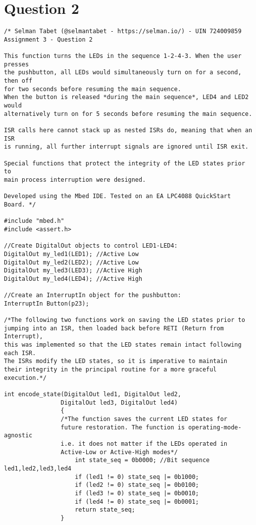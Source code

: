 \documentclass{article}
\begin{document}
\section*{Question 2}
\begin{verbatim}
/* Selman Tabet (@selmantabet - https://selman.io/) - UIN 724009859
Assignment 3 - Question 2

This function turns the LEDs in the sequence 1-2-4-3. When the user presses
the pushbutton, all LEDs would simultaneously turn on for a second, then off
for two seconds before resuming the main sequence. 
When the button is released *during the main sequence*, LED4 and LED2 would
alternatively turn on for 5 seconds before resuming the main sequence.

ISR calls here cannot stack up as nested ISRs do, meaning that when an ISR
is running, all further interrupt signals are ignored until ISR exit.

Special functions that protect the integrity of the LED states prior to
main process interruption were designed.

Developed using the Mbed IDE. Tested on an EA LPC4088 QuickStart Board. */

#include "mbed.h"
#include <assert.h>

//Create DigitalOut objects to control LED1-LED4:
DigitalOut my_led1(LED1); //Active Low
DigitalOut my_led2(LED2); //Active Low
DigitalOut my_led3(LED3); //Active High
DigitalOut my_led4(LED4); //Active High

//Create an InterruptIn object for the pushbutton:
InterruptIn Button(p23);

/*The following two functions work on saving the LED states prior to 
jumping into an ISR, then loaded back before RETI (Return from Interrupt),
this was implemented so that the LED states remain intact following each ISR.
The ISRs modify the LED states, so it is imperative to maintain
their integrity in the principal routine for a more graceful execution.*/

int encode_state(DigitalOut led1, DigitalOut led2, 
                DigitalOut led3, DigitalOut led4)
                {
                /*The function saves the current LED states for 
                future restoration. The function is operating-mode-agnostic
                i.e. it does not matter if the LEDs operated in
                Active-Low or Active-High modes*/
                    int state_seq = 0b0000; //Bit sequence led1,led2,led3,led4
                    if (led1 != 0) state_seq |= 0b1000;
                    if (led2 != 0) state_seq |= 0b0100;
                    if (led3 != 0) state_seq |= 0b0010;
                    if (led4 != 0) state_seq |= 0b0001;
                    return state_seq;
                }
                

\end{verbatim}
\end{document}
